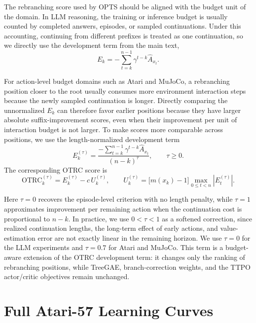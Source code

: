 The rebranching score used by OPTS should be aligned with the budget unit of the domain. In LLM reasoning, the training or inference budget is usually counted by completed answers, episodes, or sampled continuations. Under this accounting, continuing from different prefixes is treated as one continuation, so we directly use the development term from the main text,
\begin{equation}
E_k
=
-\sum_{t=k}^{n-1}\gamma^{t-k}\hat A_{x_t}.
\end{equation}

For action-level budget domains such as Atari and MuJoCo, a rebranching position closer to the root usually consumes more environment interaction steps because the newly sampled continuation is longer. Directly comparing the unnormalized $E_k$ can therefore favor earlier positions because they have larger absolute suffix-improvement scores, even when their improvement per unit of interaction budget is not larger. To make scores more comparable across positions, we use the length-normalized development term
\begin{equation}
\label{eq:appendix-length-normalized-development}
E_k^{(\tau)}
=
\frac{-\sum_{t=k}^{n-1}\gamma^{t-k}\hat A_{x_t}}{(n-k)^\tau},
\qquad
\tau\ge 0 .
\end{equation}
The corresponding OTRC score is
\begin{equation}
\label{eq:appendix-length-normalized-otrc}
\mathrm{OTRC}_k^{(\tau)}
=
E_k^{(\tau)}-c\,U_k^{(\tau)},
\qquad
U_k^{(\tau)}
=
\bigl[m(x_k)-1\bigr]\max_{0\le t<n}\left|E_t^{(\tau)}\right|.
\end{equation}

Here $\tau=0$ recovers the episode-level criterion with no length penalty, while $\tau=1$ approximates improvement per remaining action when the continuation cost is proportional to $n-k$. In practice, we use $0<\tau<1$ as a softened correction, since realized continuation lengths, the long-term effect of early actions, and value-estimation error are not exactly linear in the remaining horizon. We use $\tau=0$ for the LLM experiments and $\tau=0.7$ for Atari and MuJoCo. This term is a budget-aware extension of the OTRC development term: it changes only the ranking of rebranching positions, while TreeGAE, branch-correction weights, and the TTPO actor/critic objectives remain unchanged.

\section{Full Atari-57 Learning Curves}
\label{app:atari-curves}

